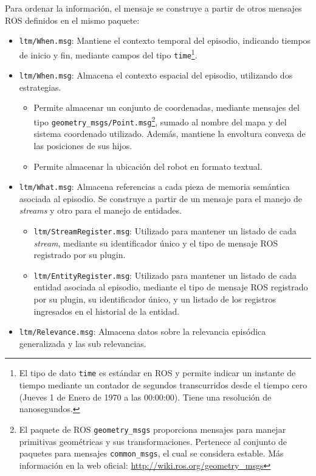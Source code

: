 Para ordenar la información, el mensaje se construye a partir de otros mensajes ROS definidos en el mismo paquete:
\begin{itemize}
\item \texttt{ltm/When.msg}: Mantiene el contexto temporal del episodio, indicando tiempos de inicio y fin, mediante campos del tipo \texttt{time}\footnote{El tipo de dato \texttt{time} es estándar en ROS y permite indicar un instante de tiempo mediante un contador de segundos transcurridos desde el tiempo cero (Jueves 1 de Enero de 1970 a las 00:00:00). Tiene una resolución de nanosegundos.}.
\item \texttt{ltm/When.msg}: Almacena el contexto espacial del episodio, utilizando dos estrategias.
\begin{itemize}
\item  Permite almacenar un conjunto de coordenadas, mediante mensajes del tipo \texttt{geometry\_msgs/Point.msg}\footnote{El paquete de ROS \texttt{geometry\_msgs} proporciona mensajes para manejar primitivas geométricas y sus transformaciones. Pertenece al conjunto de paquetes para mensajes \texttt{common\_msgs}, el cual se considera estable. Más información en la web oficial: \url{http://wiki.ros.org/geometry\_msgs}}, sumado al nombre del mapa y del sistema coordenado utilizado. Además, mantiene la envoltura convexa de las posiciones de sus hijos.
\item Permite almacenar la ubicación del robot en formato textual.
\end{itemize}
\item \texttt{ltm/What.msg}: Almacena referencias a cada pieza de memoria semántica asociada al episodio. Se construye a partir de un mensaje para el manejo de \textit{streams} y otro para el manejo de entidades.
\begin{itemize}
\item \texttt{ltm/StreamRegister.msg}: Utilizado para mantener un listado de cada \textit{stream}, mediante su identificador único y el tipo de mensaje ROS registrado por su plugin.
\item \texttt{ltm/EntityRegister.msg}: Utilizado para mantener un listado de cada entidad asociada al episodio, mediante el tipo de mensaje ROS registrado por su plugin, su identificador único, y un listado de los registros ingresados en el historial de la entidad.
\end{itemize}
\item \texttt{ltm/Relevance.msg}: Almacena datos sobre la relevancia episódica generalizada y las sub relevancias.

\end{itemize}
